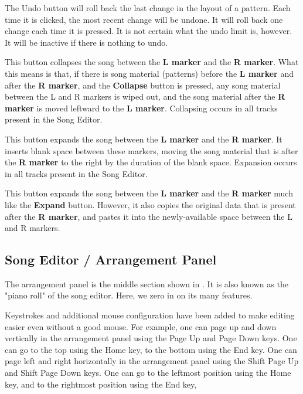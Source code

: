    The Undo button will roll back the last change in the layout of a
   pattern.  Each time it is clicked, the most recent change will be undone.
   It will roll back one change each time it is pressed.
   It is not certain what the undo limit is, however.
   It will be inactive if there is nothing to undo.

   This button collapses the song between the \textbf{L marker} and the
   \textbf{R marker}.
   What this means is that, if there is song material (patterns) before the
   \textbf{L marker} and after the \textbf{R marker},
   and the \textbf{Collapse} button is
   pressed, any song material between the L and R markers is wiped out, and
   the song material after the \textbf{R marker} is moved leftward to
   the \textbf{L marker}.
   Collapsing occurs in all tracks present in the Song Editor.

   This button expands the song between the
   \textbf{L marker} and the \textbf{R marker}.
   It inserts blank space between these markers, moving the song material
   that is after the \textbf{R marker}
   to the right by the duration of the blank space.
   Expansion occurs in all tracks present in the Song Editor.

   This button expands the song between the \textbf{L marker} and the
   \textbf{R marker} much like the \textbf{Expand} button.
   However, it also copies the original data that is present after the
   \textbf{R marker}, and pastes it into the newly-available space between
   the L and R markers.

\subsection{Song Editor / Arrangement Panel}
\label{subsec:seq64_song_editor_arrangement_panel}

   The arrangement panel is the middle section shown in
   .  It is also known as the
   "piano roll" of the song editor. Here, we zero in on its many
   features.

   Keystrokes and additional mouse configuration have been added to make
   editing easier even without a good mouse.
   For example, one can page up and down vertically in the arrangement
   panel using the
    Page Up and 
    Page Down keys.
   One can go to the top using the 
    Home key,
   to the bottom using the
    End key.
   One can page left and right horizontally in the arrangement
   panel using the
    Shift Page Up and 
    Shift Page Down keys.
   One can go to the leftmost position using the 
    Home key,
   and to the rightmost position using the
    End key,


